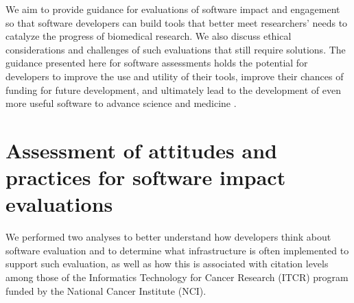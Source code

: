 \documentclass{article}
\begin{document}
We aim to provide guidance for evaluations of software impact and engagement so that software developers can build tools that better meet researchers' needs to catalyze the progress of biomedical research. We also discuss ethical considerations and challenges of such evaluations that still require solutions. The guidance presented here for software assessments holds the potential for developers to improve the use and utility of their tools, improve their chances of funding for future development, and ultimately lead to the development of even more useful software to advance science and medicine \cite{wratten_reproducible_2021}. 



\section{Assessment of attitudes and practices for software impact evaluations}

We performed two analyses to better understand how developers think about software evaluation and to determine what infrastructure is often implemented to support such evaluation, as well as how this is associated with citation levels among those of the Informatics Technology for Cancer Research (ITCR) program funded by the National Cancer Institute (NCI). 
\end{document}

